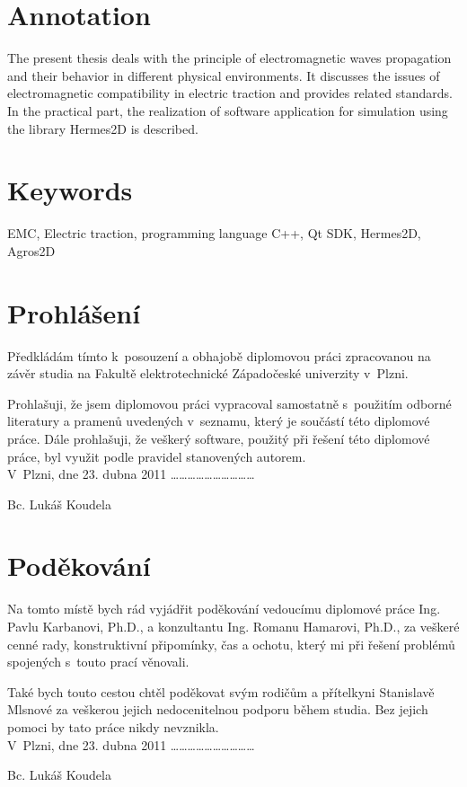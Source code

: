 \bigskip

\section*{Annotation}

The present thesis deals with the principle of electromagnetic waves propagation and their behavior in different physical environments. It discusses the issues of electromagnetic compatibility in electric traction and provides related standards. In the practical part, the realization of software application for simulation using the library Hermes2D is described.

\section*{Keywords}
EMC, Electric traction, programming language C++, Qt SDK, Hermes2D, Agros2D
\newpage

\section*{Prohlášení}
Předkládám tímto k~posouzení a obhajobě diplomovou práci zpracovanou na závěr studia na Fakultě elektrotechnické Západočeské univerzity v~Plzni.

Prohlašuji, že jsem diplomovou práci vypracoval samostatně s~použitím odborné literatury a pramenů uvedených v~seznamu, který je součástí této diplomové práce.
Dále prohlašuji, že veškerý software, použitý při řešení této diplomové práce, byl využit podle pravidel stanovených autorem.\bigskip \bigskip \\

\noindent V~Plzni, dne 23. dubna 2011 \hfill \ldots \ldots \ldots \ldots \ldots \ldots \ldots \ldots \ldots \ldots
\noindent \begin{flushright}Bc. Lukáš Koudela ~~~~~~~\end{flushright}
\newpage

\section*{Poděkování}
Na tomto místě bych rád vyjádřit poděkování vedoucímu diplomové práce Ing. Pavlu Karbanovi, Ph.D., a konzultantu Ing. Romanu Hamarovi, Ph.D., za veškeré cenné rady, konstruktivní připomínky, čas a ochotu, který mi při řešení problémů spojených s~touto prací věnovali.

Také bych touto cestou chtěl poděkovat svým rodičům a přítelkyni Stanislavě Mlsnové za veškerou jejich nedocenitelnou podporu během studia. Bez jejich pomoci by tato práce nikdy nevznikla.\bigskip \bigskip \\

\noindent V~Plzni, dne 23. dubna 2011 \hfill \ldots \ldots \ldots \ldots \ldots \ldots \ldots \ldots \ldots \ldots
\noindent \begin{flushright}Bc. Lukáš Koudela ~~~~~~~\end{flushright}
\newpage